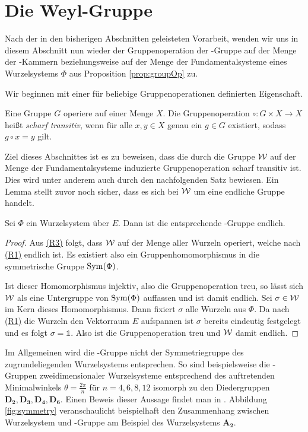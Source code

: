 \section{Die Weyl-Gruppe}
\label{sec:weylgroup}

Nach der in den bisherigen Abschnitten geleisteten Vorarbeit, wenden wir uns in diesem Abschnitt nun wieder der Gruppenoperation der \weyl\hyp{}Gruppe auf der Menge der \weyl\hyp{}Kammern beziehungsweise auf der Menge der Fundamentalsysteme eines Wurzelsystems $\Phi$ aus Proposition \ref{prop:groupOp} zu.

Wir beginnen mit einer für beliebige Gruppenoperationen definierten Eigenschaft.

\begin{defn}
  Eine Gruppe $G$ operiere auf einer Menge $X$.
  Die Gruppenoperation $\circ \colon G \times X \to X$ heißt \emph{scharf transitiv}, wenn für alle $x,y \in X$ genau ein $g \in G$ existiert, sodass $g \circ x = y$ gilt. 
\end{defn}

Ziel dieses Abschnittes ist es zu beweisen, dass die durch die Gruppe $\mathcal{W}$ auf der Menge der Fundamentalsysteme induzierte Gruppenoperation scharf transitiv ist.
Dies wird unter anderem auch durch den nachfolgenden Satz bewiesen.
Ein Lemma stellt zuvor noch sicher, dass es sich bei $\mathcal{W}$ um eine endliche Gruppe handelt.

\begin{lem}
  \label{lem:weylFinite}
  Sei $\Phi$ ein Wurzelsystem über $E$. Dann ist die entsprechende \weyl\hyp{}Gruppe endlich. 
\end{lem}

\begin{proof}
  Aus \hyperref[it:R3]{(R3)} folgt, dass $\mathcal{W}$ auf der Menge aller Wurzeln operiert, welche nach \hyperref[it:R1]{(R1)} endlich ist.
  Es existiert also ein Gruppenhomomorphismus in die symmetrische Gruppe $\operatorname{Sym}(\Phi)$.

  Ist dieser Homomorphismus injektiv, also die Gruppenoperation treu, so lässt sich $\mathcal{W}$ als eine Untergruppe von $\operatorname{Sym}(\Phi)$ auffassen und ist damit endlich.
  Sei $\sigma \in \mathcal{W}$ im Kern dieses Homomorphismus.
  Dann fixiert $\sigma$ alle Wurzeln aus $\Phi$.
  Da nach \hyperref[it:R1]{(R1)} die Wurzeln den Vektorraum $E$ aufspannen ist $\sigma$ bereits eindeutig festgelegt und es folgt $\sigma = \mathds{1}$.
  Also ist die Gruppenoperation treu und $\mathcal{W}$ damit endlich.
\end{proof}

\begin{bem}
  Im Allgemeinen wird die \weyl\hyp{}Gruppe nicht der Symmetriegruppe des zugrundeliegenden Wurzelsystems entsprechen.
  So sind beispielsweise die \weyl\hyp{}Gruppen zweidimensionaler Wurzelsysteme entsprechend des auftretenden Minimalwinkels $\theta = \tfrac{2\pi}{n}$ für $n = 4,6,8,12$ isomorph zu den Diedergruppen $\mathbf{D_2}, \mathbf{D_3}, \mathbf{D_4}, \mathbf{D_6}$.
  Einen Beweis dieser Aussage findet man in \cite[S.203f.]{hall2015lie}.
  Abbildung \ref{fig:symmetry} veranschaulicht beispielhaft den Zusammenhang zwischen Wurzelsystem und \weyl\hyp{}Gruppe am Beispiel des Wurzelsystems $\mathbf{A_2}$.
\end{bem}

